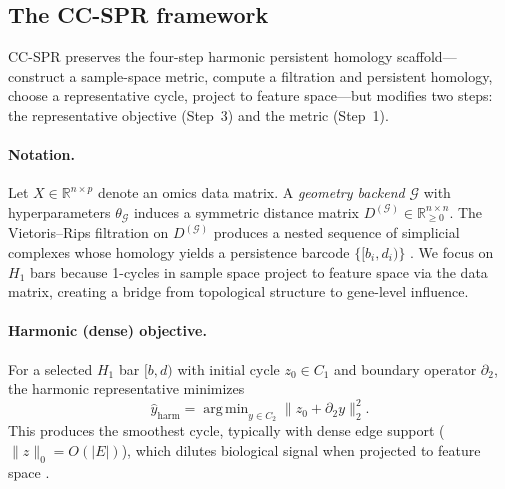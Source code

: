 \documentclass[12pt]{article}
\DeclareMathOperator*{\argmin}{arg\,min}
\begin{document}
\subsection{The CC-SPR framework}
\label{sec:ccspr_framework}

CC-SPR preserves the four-step harmonic persistent homology scaffold---construct a sample-space metric, compute a filtration and persistent homology, choose a representative cycle, project to feature space---but modifies two steps: the representative objective (Step~3) and the metric (Step~1).

\paragraph{Notation.}
Let $X \in \mathbb{R}^{n \times p}$ denote an omics data matrix.
A \emph{geometry backend} $\mathcal{G}$ with hyperparameters $\theta_{\mathcal{G}}$ induces a symmetric distance matrix $D^{(\mathcal{G})} \in \mathbb{R}_{\ge 0}^{n \times n}$.
The Vietoris--Rips filtration on $D^{(\mathcal{G})}$ produces a nested sequence of simplicial complexes whose homology yields a persistence barcode $\{[b_i, d_i)\}$ \cite{zomorodian2005, edelsbrunner2010}.
We focus on $H_1$ bars because 1-cycles in sample space project to feature space via the data matrix, creating a bridge from topological structure to gene-level influence.

\paragraph{Harmonic (dense) objective.}
For a selected $H_1$ bar $[b, d)$ with initial cycle $z_0 \in C_1$ and boundary operator $\partial_2$, the harmonic representative minimizes
\begin{equation}\label{eq:harmonic}
\hat{y}_{\mathrm{harm}} = \argmin_{y \in C_2} \| z_0 + \partial_2 y \|_2^2.
\end{equation}
This produces the smoothest cycle, typically with dense edge support ($\|z\|_0 = O(|E|)$), which dilutes biological signal when projected to feature space \cite{harmonicPH, friedman1998}.
\end{document}
